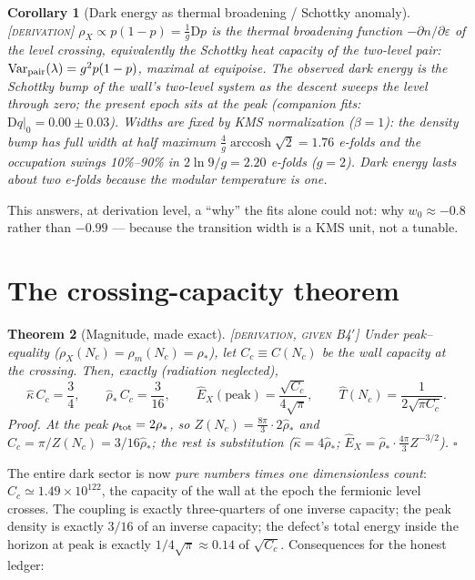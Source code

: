 \documentclass[11pt,reqno]{amsart}
\numberwithin{equation}{section}
\newtheorem{theorem}{Theorem}[section]
\newtheorem{corollary}[theorem]{Corollary}
\theoremstyle{definition}
\theoremstyle{remark}
\newcommand{\slab}[1]{\textup{[\textsc{#1}]}}
\newcommand{\D}{\mathrm D}
\newcommand{\Var}{\operatorname{Var}}
\begin{document}
\begin{corollary}[Dark energy as thermal broadening / Schottky
anomaly]\label{cor:schottky}
\slab{derivation} $\rho_X\propto p(1-p)=\tfrac1g\D p$ is the thermal
broadening function $-\partial n/\partial\varepsilon$ of the level
crossing, equivalently the Schottky heat capacity of the two-level pair:
$\Var_{\rm pair}(\lambda)=g^2p(1-p)$, maximal at equipoise. The observed
dark energy is the Schottky bump of the wall's two-level system as the
descent sweeps the level through zero; the present epoch sits at the
peak (companion fits: $\D q|_0=0.00\pm0.03$). Widths are fixed by KMS
normalization ($\beta=1$): the density bump has full width at half
maximum $\tfrac4g\operatorname{arccosh}\sqrt2=1.76$ e-folds and the
occupation swings 10\%--90\% in $2\ln9/g=2.20$ e-folds ($g=2$).
\emph{Dark energy lasts about two e-folds because the modular temperature
is one.}
\end{corollary}

This answers, at derivation level, a ``why'' the fits alone could not:
why $w_0\approx-0.8$ rather than $-0.99$ --- because the transition
width is a KMS unit, not a tunable.

\section{The crossing-capacity theorem}\label{sec:crossing}

\begin{theorem}[Magnitude, made exact]\label{thm:crossing}
\slab{derivation, given B4$'$} Under peak--equality
($\rho_X(N_c)=\rho_m(N_c)=\rho_*$), let $C_c\equiv C(N_c)$ be the wall
capacity at the crossing. Then, exactly (radiation neglected),
\begin{equation}\label{eq:crossing}
\hat\kappa\,C_c=\frac34,\qquad
\hat\rho_*\,C_c=\frac{3}{16},\qquad
\hat E_X(\mathrm{peak})=\frac{\sqrt{C_c}}{4\sqrt{\pi}},\qquad
\hat T(N_c)=\frac{1}{2\sqrt{\pi C_c}} .
\end{equation}
\emph{Proof.} At the peak $\rho_{\rm tot}=2\rho_*$, so
$Z(N_c)=\tfrac{8\pi}{3}\cdot2\hat\rho_*$ and
$C_c=\pi/Z(N_c)=3/16\hat\rho_*$; the rest is substitution
($\hat\kappa=4\hat\rho_*$;
$\hat E_X=\hat\rho_*\cdot\tfrac{4\pi}{3}Z^{-3/2}$). $\square$
\end{theorem}

The entire dark sector is now \emph{pure numbers times one dimensionless
count}: $C_c\simeq1.49\times10^{122}$, the capacity of the wall at the
epoch the fermionic level crosses. The coupling is exactly
three-quarters of one inverse capacity; the peak density is exactly
$3/16$ of an inverse capacity; the defect's total energy inside the
horizon at peak is exactly $1/4\sqrt\pi\approx0.14$ of $\sqrt{C_c}$.
Consequences for the honest ledger:
\end{document}
